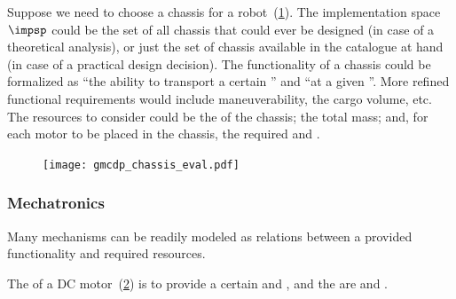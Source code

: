 \begin{example}
\label{exa:chassis}Suppose we need to choose a chassis for a robot~(\cref{fig:gmcdp_chassis_eval}).
The implementation space~$\impsp$ could be the set of all chassis
that could ever be designed (in case of a theoretical analysis), or
just the set of chassis available in the catalogue at hand (in case
of a practical design decision). The functionality of a chassis could
be formalized as ``the ability to transport a certain '' and ``at a given ''. More refined
functional requirements would include maneuverability, the cargo volume,
etc. The resources to consider could be the  of
the chassis; the total mass; and, for each motor to be placed in the
chassis, the required  and .
\end{example}
\begin{figure}[h]
    \centering
    \texttt{[image: gmcdp\_chassis\_eval.pdf]}
    \caption{\label{fig:gmcdp_chassis_eval}}
\end{figure}
 

\subsubsection{Mechatronics}


Many mechanisms can be readily modeled as relations between a provided
functionality and required resources.


\begin{example}
The  of a DC motor~(\cref{fig:dc_motor})
is to provide a certain  and , and the 
are  and .
\end{example}

\begin{figure}[h]
\begin{center}
\end{center}
\caption{\label{fig:dc_motor}}
\end{figure}


